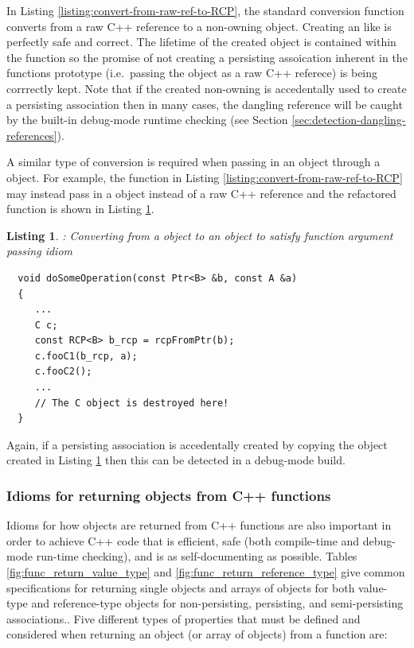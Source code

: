 \documentclass[pdf,ps2pdf,11pt]{SANDreport}
\newtheorem{listing}{Listing}
\begin{document}
In Listing {}\ref{listing:convert-from-raw-ref-to-RCP}, the standard
conversion function {} converts from a raw C++
reference to a non-owning {} object.  Creating an {}
like is perfectly safe and correct.  The lifetime of the created
{} object is contained within the function
{} so the promise of not creating a
persisting assoication inherent in the functions prototype (i.e.\
passing the {} object as a raw C++ referece) is being
corrrectly kept.  Note that if the created non-owning {} is
accedentally used to create a persisting association then in many
cases, the dangling reference will be caught by the built-in
debug-mode runtime checking (see Section
{}\ref{sec:detection-dangling-references}).

A similar type of conversion is required when passing in an object
through a {}\ttt{Ptr} object.  For example, the function in Listing
{}\ref{listing:convert-from-raw-ref-to-RCP} may instead pass in a
{}\ttt{Ptr<B>} object instead of a raw C++ reference {}\ttt{B\&} and
the refactored function is shown in Listing
{}\ref{listing:convert-from-Ptr-to-RCP}.


{}\begin{listing}: Converting from a {} object to an
{} object to satisfy function argument passing idiom
\label{listing:convert-from-Ptr-to-RCP}
{\small\begin{verbatim}
  void doSomeOperation(const Ptr<B> &b, const A &a)
  {
     ...
     C c;
     const RCP<B> b_rcp = rcpFromPtr(b);
     c.fooC1(b_rcp, a);
     c.fooC2();
     ...
     // The C object is destroyed here!
  }
\end{verbatim}}
\end{listing}


Again, if a persisting association is accedentally created by copying
the {}\ttt{RCP<B>} object created in Listing
{}\ref{listing:convert-from-Ptr-to-RCP} then this can be detected in a
debug-mode build.


%
{}\subsubsection{Idioms for returning objects from C++ functions}
\label{sec:idioms-returning-objects}
%

Idioms for how objects are returned from C++ functions are also
important in order to achieve C++ code that is efficient, safe (both
compile-time and debug-mode run-time checking), and is as
self-documenting as possible.  Tables
{}\ref{fig:func_return_value_type} and
{}\ref{fig:func_return_reference_type} give common specifications for
returning single objects and arrays of objects for both value-type and
reference-type objects for non-persisting, persisting, and
semi-persisting associations..  Five different types of properties
that must be defined and considered when returning an object (or array
of objects) from a function are:
\end{document}
